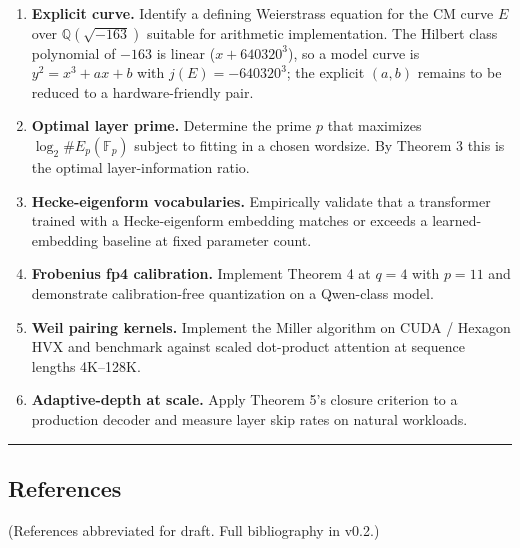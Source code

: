 \documentclass[
  11pt,
]{article}
\begin{document}
\begin{enumerate}
\def\labelenumi{\arabic{enumi}.}
\item
  \textbf{Explicit curve.} Identify a defining Weierstrass equation for
  the CM curve \(E\) over \(\mathbb{Q}(\sqrt{-163})\) suitable for
  arithmetic implementation. The Hilbert class polynomial of \(-163\) is
  linear (\(x + 640320^3\)), so a model curve is \(y^2 = x^3 + a x + b\)
  with \(j(E) = -640320^3\); the explicit \((a, b)\) remains to be
  reduced to a hardware-friendly pair.
\item
  \textbf{Optimal layer prime.} Determine the prime \(p\) that maximizes
  \(\log_2 \#E_p(\mathbb{F}_p)\) subject to fitting in a chosen
  wordsize. By Theorem 3 this is the optimal layer-information ratio.
\item
  \textbf{Hecke-eigenform vocabularies.} Empirically validate that a
  transformer trained with a Hecke-eigenform embedding matches or
  exceeds a learned-embedding baseline at fixed parameter count.
\item
  \textbf{Frobenius fp4 calibration.} Implement Theorem 4 at \(q = 4\)
  with \(p = 11\) and demonstrate calibration-free quantization on a
  Qwen-class model.
\item
  \textbf{Weil pairing kernels.} Implement the Miller algorithm on CUDA
  / Hexagon HVX and benchmark against scaled dot-product attention at
  sequence lengths 4K--128K.
\item
  \textbf{Adaptive-depth at scale.} Apply Theorem 5's closure criterion
  to a production decoder and measure layer skip rates on natural
  workloads.
\end{enumerate}

\begin{center}\rule{0.5\linewidth}{0.5pt}\end{center}

\hypertarget{references}{%
\subsection{References}\label{references}}

(References abbreviated for draft. Full bibliography in v0.2.)
\end{document}
